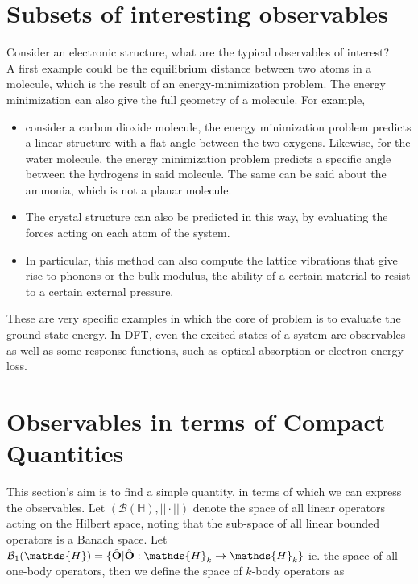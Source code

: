 \documentclass{homework}
\begin{document}
\section{Subsets of interesting observables}

Consider an electronic structure, what are the typical observables of interest? \\

A first example could be the equilibrium distance between two atoms in a molecule, which is the result of an energy-minimization problem. The energy minimization can also give the full geometry of a molecule. 
For example, 

\begin{itemize}
    \item consider a carbon dioxide molecule, the energy minimization problem predicts a linear structure with a flat angle between the two oxygens. Likewise, for the water molecule, the energy minimization problem predicts a specific angle between the hydrogens in said molecule. The same can be said about the ammonia, which is not a planar molecule. 
    \item The crystal structure can also be predicted in this way, by evaluating the forces acting on each atom of the system.
    \item In particular, this method can also compute the lattice vibrations that give rise to phonons or the bulk modulus, the ability of a certain material to resist to a certain external pressure. \\
\end{itemize}

These are very specific examples in which the core of problem is to evaluate the ground-state energy. In DFT, even the excited states of a system are observables as well as some response functions, such as optical absorption or electron energy loss. \\

\section{Observables in terms of Compact Quantities}

This section's aim is to find a simple quantity, in terms of which we can express the observables. Let $(\mathcal{B}(\mathds{H}), ||\cdot||)$ denote the space of all linear operators acting on the Hilbert space, noting that the sub-space of all linear bounded operators is a Banach space. Let $\mathcal{B}_1(\mathds{H})=\{\hat{\bf O}| \hat{\bf O}:\mathds{H}_k \rightarrow \mathds{H}_k \}$ ie. the space of all one-body operators, then we define the space of $k$-body operators as 
\end{document}
